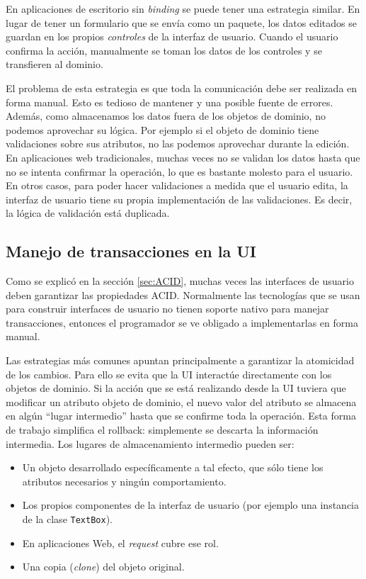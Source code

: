 	En aplicaciones de escritorio sin \emph{binding} se puede tener una estrategia
	similar. En lugar de tener un formulario que se envía como un paquete, los
	datos editados se guardan en los propios \emph{controles} de la interfaz de
	usuario. Cuando el usuario confirma la acción, manualmente se toman los datos
	de los controles y se transfieren al dominio.

	\medskip
	
	El problema de esta estrategia es que toda la comunicación debe ser realizada
	en forma manual. Esto es tedioso de mantener y una posible fuente de errores.
	Además, como almacenamos los datos fuera de los objetos de dominio, no podemos
	aprovechar su lógica. Por ejemplo si el objeto de dominio tiene validaciones
	sobre sus atributos, no las podemos aprovechar durante la edición. En
	aplicaciones web tradicionales, muchas veces no se validan los datos hasta que
	no se intenta confirmar la operación, lo que es bastante molesto para el
	usuario. En otros casos, para poder hacer validaciones a medida que el usuario
	edita, la interfaz de usuario tiene su propia implementación de las validaciones. 
	Es decir, la lógica de validación está duplicada.
	 		
\subsection{Manejo de transacciones en la UI}
	Como se explicó en la sección \ref{sec:ACID}, muchas veces las interfaces de
	usuario deben garantizar las propiedades ACID.
	Normalmente las tecnologías que se usan para construir interfaces de usuario no
	tienen soporte nativo para manejar transacciones, entonces el programador se ve
	obligado a implementarlas en forma manual.
	
	Las estrategias más comunes apuntan principalmente a garantizar la atomicidad
	de los cambios. Para ello se evita que la UI interactúe
	directamente con los objetos de dominio. Si la acción que se está realizando
	desde la UI tuviera que modificar un atributo objeto de dominio, el nuevo valor
	del atributo se almacena en algún ``lugar intermedio'' hasta que se confirme toda
	la operación. Esta forma de trabajo simplifica el rollback: simplemente se
	descarta la información intermedia. Los lugares de almacenamiento intermedio
	pueden ser:
	\begin{itemize}
	  \item Un objeto desarrollado específicamente a tal efecto, que sólo tiene los
	  atributos necesarios y ningún comportamiento. 
	  \item Los propios componentes de la interfaz de usuario (por
	  ejemplo una instancia de la clase \texttt{TextBox}).
	  \item En aplicaciones Web, el \emph{request} cubre ese rol.
	  \item Una copia (\emph{clone}) del objeto original.
	\end{itemize}
	
